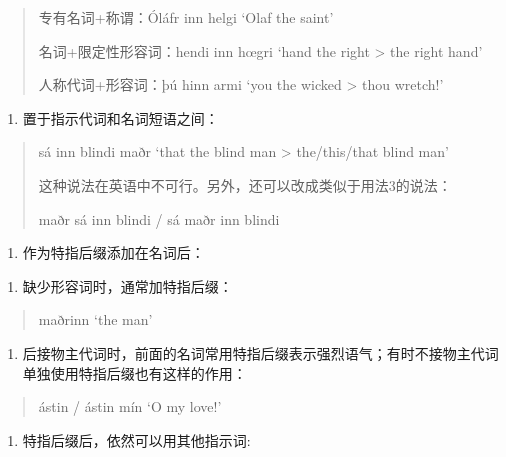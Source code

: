\begin{quote}
  专有名词+称谓：Óláfr inn helgi `Olaf the saint'

  名词+限定性形容词：hendi inn hœgri `hand the right \textgreater{} the
  right hand'

  人称代词+形容词：þú hinn armi `you the wicked \textgreater{} thou
  wretch!'
\end{quote}

\begin{enumerate}
  \def\labelenumi{\arabic{enumi})}
  \setcounter{enumi}{3}
  \item
        置于指示代词和名词短语之间：
\end{enumerate}

\begin{quote}
  sá inn blindi maðr `that the blind man \textgreater{} the/this/that
  blind man'

  这种说法在英语中不可行。另外，还可以改成类似于用法3的说法：

  maðr sá inn blindi / sá maðr inn blindi
\end{quote}

\begin{enumerate}
  \def\labelenumi{\Alph{enumi}.}
  \setcounter{enumi}{1}
  \item
        作为特指后缀添加在名词后：
\end{enumerate}

\begin{enumerate}
  \def\labelenumi{\arabic{enumi})}
  \item
        缺少形容词时，通常加特指后缀：
\end{enumerate}

\begin{quote}
  maðrinn `the man'
\end{quote}

\begin{enumerate}
  \def\labelenumi{\arabic{enumi})}
  \setcounter{enumi}{1}
  \item
        后接物主代词时，前面的名词常用特指后缀表示强烈语气；有时不接物主代词单独使用特指后缀也有这样的作用：
\end{enumerate}

\begin{quote}
  ástin / ástin mín `O my love!'
\end{quote}

\begin{enumerate}
  \def\labelenumi{\arabic{enumi})}
  \setcounter{enumi}{2}
  \item
        特指后缀后，依然可以用其他指示词:
\end{enumerate}

